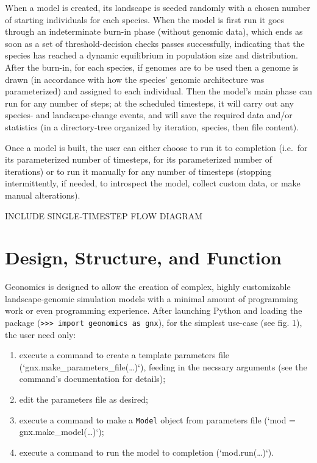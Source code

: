 ﻿\documentclass{article}
\begin{document}
When a model is created, its landscape is seeded randomly with a chosen number of
starting individuals for each species. When the model is first run it goes through an
indeterminate burn-in phase (without genomic data), which ends as soon as a set of
threshold-decision checks passes successfully, indicating that the species has
reached a dynamic equilibrium in population size and distribution.
After the burn-in, for each species, if genomes are to be used then a genome is drawn
(in accordance with how the species' genomic architecture was parameterized)
and assigned to each individual.
Then the model's main phase can run for any number of steps; at the scheduled
timesteps, it will carry out any species- and landscape-change events,
and will save the required data and/or statistics
(in a directory-tree organized by iteration, species, then file content).

Once a model is built, the user can either choose to run it to completion (i.e.\ for its
parameterized number of timesteps, for its parameterized number of iterations) or to
run it manually for any number of timesteps (stopping intermittently, if needed, to
introspect the model, collect custom data, or make manual alterations).

{\large INCLUDE SINGLE-TIMESTEP FLOW DIAGRAM}


\section{Design, Structure, and Function}
Geonomics is designed to allow the creation of complex, highly customizable
landscape-genomic simulation models with a minimal amount of programming work or even
programming experience.
After launching Python and loading the package (\texttt{>>> import geonomics as gnx}),
for the simplest use-case (see fig. 1), the user need only:
\begin{enumerate}
        \item execute a command to create a template parameters file (`gnx.make\_parameters\_file(\ldots)`), feeding in the necssary arguments (see the command's documentation for details);
        \item edit the parameters file as desired;
        \item execute a command to make a \texttt{Model} object from parameters file (`mod = gnx.make\_model(\ldots)`);
        \item execute a command to run the model to completion (`mod.run(\ldots)`).
\end{enumerate}
\end{document}
